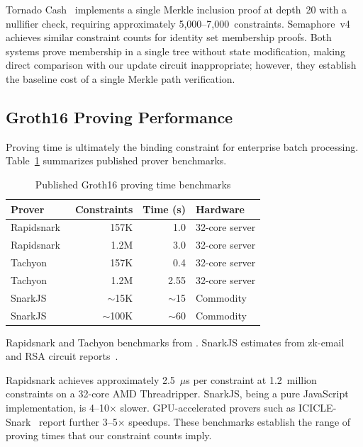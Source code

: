 Tornado Cash~\cite{tornadocash2019} implements a single Merkle inclusion
proof at depth~20 with a nullifier check, requiring approximately
5,000--7,000~constraints. Semaphore~v4~\cite{semaphore2024v4} achieves
similar constraint counts for identity set membership proofs. Both systems
prove membership in a single tree without state modification, making
direct comparison with our update circuit inappropriate; however, they
establish the baseline cost of a single Merkle path verification.

\subsection{Groth16 Proving Performance}

Proving time is ultimately the binding constraint for enterprise batch
processing. Table~\ref{tab:prover-benchmarks} summarizes published prover
benchmarks.

\begin{table}[htbp]
\centering
\caption{Published Groth16 proving time benchmarks}
\label{tab:prover-benchmarks}
\begin{tabular}{@{}lrrl@{}}
\toprule
\textbf{Prover} & \textbf{Constraints} & \textbf{Time (s)} & \textbf{Hardware} \\
\midrule
Rapidsnark~\cite{rapidsnark2024} & 157K & 1.0 & 32-core server \\
Rapidsnark~\cite{rapidsnark2024} & 1.2M & 3.0 & 32-core server \\
Tachyon~\cite{tachyon2024} & 157K & 0.4 & 32-core server \\
Tachyon~\cite{tachyon2024} & 1.2M & 2.55 & 32-core server \\
SnarkJS~\cite{snarkjs} & $\sim$15K & $\sim$15 & Commodity \\
SnarkJS~\cite{snarkjs} & $\sim$100K & $\sim$60 & Commodity \\
\bottomrule
\end{tabular}
\par\vspace{1mm}
\parbox{\columnwidth}{\footnotesize Rapidsnark and Tachyon benchmarks from \cite{tachyon2024}.
SnarkJS estimates from zk-email and RSA circuit reports~\cite{zkmopro2024}.}
\end{table}
\FloatBarrier

Rapidsnark achieves approximately 2.5~$\mu$s per constraint at 1.2~million
constraints on a 32-core AMD Threadripper. SnarkJS, being a pure JavaScript
implementation, is 4--10$\times$ slower. GPU-accelerated provers such as
ICICLE-Snark~\cite{ingonyama2024icicle} report further 3--5$\times$
speedups. These benchmarks establish the range of proving times that our
constraint counts imply.
